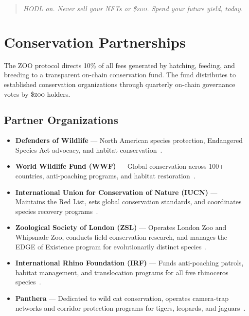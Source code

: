 \documentclass[11pt,letterpaper]{article}
\newcommand{\ZOO}{\$\textsc{zoo}}
\begin{document}
\begin{quote}
\textit{HODL on.  Never sell your NFTs or \ZOO{}.  Spend your future yield, today.}
\end{quote}

\section{Conservation Partnerships}
\label{sec:conservation}

The ZOO protocol directs 10\% of all fees generated by hatching, feeding, and breeding
to a transparent on-chain conservation fund.  The fund distributes to established
conservation organizations through quarterly on-chain governance votes by \ZOO{} holders.

\subsection{Partner Organizations}

\begin{itemize}
    \item \textbf{Defenders of Wildlife} --- North American species protection, Endangered
          Species Act advocacy, and habitat conservation~\cite{defenders2021}.
    \item \textbf{World Wildlife Fund (WWF)} --- Global conservation across 100+ countries,
          anti-poaching programs, and habitat restoration~\cite{wwf2020}.
    \item \textbf{International Union for Conservation of Nature (IUCN)} --- Maintains the
          Red List, sets global conservation standards, and coordinates species recovery
          programs~\cite{iucn2021}.
    \item \textbf{Zoological Society of London (ZSL)} --- Operates London Zoo and Whipsnade
          Zoo, conducts field conservation research, and manages the EDGE of Existence
          program for evolutionarily distinct species~\cite{zsl2021}.
    \item \textbf{International Rhino Foundation (IRF)} --- Funds anti-poaching patrols,
          habitat management, and translocation programs for all five rhinoceros
          species~\cite{irf2021}.
    \item \textbf{Panthera} --- Dedicated to wild cat conservation, operates camera-trap
          networks and corridor protection programs for tigers, leopards, and
          jaguars~\cite{panthera2021}.
\end{itemize}
\end{document}
